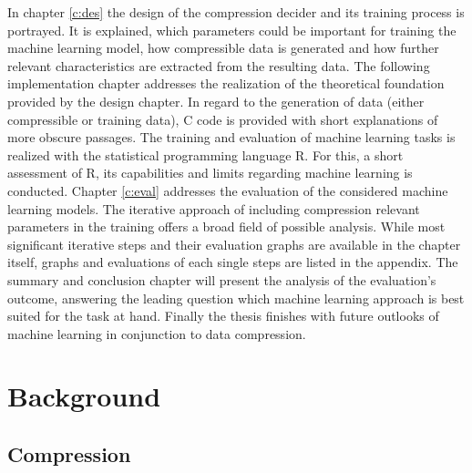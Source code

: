 \documentclass[
	12pt,
	a4paper,
	BCOR10mm,
	DIV14,
	headsepline,
]{scrreprt}
\begin{document}
In chapter \ref{c:des} the design of the compression decider and its training process is portrayed.
It is explained, which parameters could be important for training the machine learning model, how compressible data is generated and how further relevant characteristics are extracted from the resulting data. %
The following implementation chapter addresses the realization of the theoretical foundation provided by the design chapter.
In regard to the generation of data (either compressible or training data), C code is provided with short explanations of more obscure passages.
The training and evaluation of machine learning tasks is realized with the statistical programming language R.
For this, a short assessment of R, its capabilities and limits regarding machine learning is conducted.
Chapter \ref{c:eval} addresses the evaluation of the considered machine learning models.
The iterative approach of including compression relevant parameters in the training offers a broad field of possible analysis.
While most significant iterative steps and their evaluation graphs are available in the chapter itself, graphs and evaluations of each single steps are listed in the appendix. %
The summary and conclusion chapter will present the analysis of the evaluation's outcome, answering the leading question which machine learning approach is best suited for the task at hand.
Finally the thesis finishes with future outlooks of machine learning in conjunction to data compression.

\chapter{Background} %
\label{c:bg}

\section{Compression}
\label{s:comp}




\end{document}
